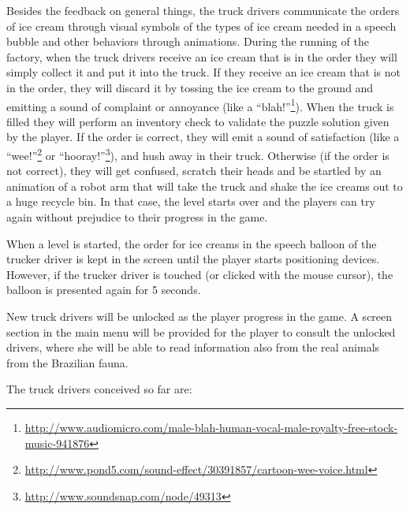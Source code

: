 \documentclass[a4paper]{scrartcl}
\begin{document}
			Besides the feedback on general things, the truck drivers communicate the orders of ice cream through visual symbols of the types of ice cream needed in a speech bubble and other behaviors through animations. During the running of the factory, when the truck drivers receive an ice cream that is in the order they will simply collect it and put it into the truck. If they receive an ice cream that is not in the order, they will discard it by tossing the ice cream to the ground and emitting a sound of complaint or annoyance (like a ``blah!''\footnote{\url{http://www.audiomicro.com/male-blah-human-vocal-male-royalty-free-stock-music-941876}}). When the truck is filled they will perform an inventory check to validate the puzzle solution given by the player. If the order is correct, they will emit a sound of satisfaction (like a ``wee!''\footnote{\url{http://www.pond5.com/sound-effect/30391857/cartoon-wee-voice.html}} or ``hooray!''\footnote{\url{http://www.soundsnap.com/node/49313}}), and hush away in their truck. Otherwise (if the order is not correct), they will get confused, scratch their heads and be startled by an animation of a robot arm that will take the truck and shake the ice creams out to a huge recycle bin. In that case, the level starts over and the players can try again without prejudice to their progress in the game.
		
			When a level is started, the order for ice creams in the speech balloon of the trucker driver is kept in the screen until the player starts positioning devices. However, if the trucker driver is touched (or clicked with the mouse cursor), the balloon is presented again for 5 seconds.
		
			New truck drivers will be unlocked as the player progress in the game. A screen section in the main menu will be provided for the player to consult the unlocked drivers, where she will be able to read information also from the real animals from the Brazilian fauna.
		
			The truck drivers conceived so far are:
		
\end{document}
